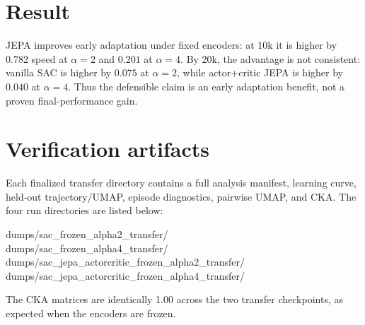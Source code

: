 \documentclass[10pt]{article}
\begin{document}
\section*{Result}
JEPA improves early adaptation under fixed encoders: at 10k it is higher by
$0.782$ speed at $\alpha=2$ and $0.201$ at $\alpha=4$.  By 20k, the advantage
is not consistent: vanilla SAC is higher by $0.075$ at $\alpha=2$, while
actor+critic JEPA is higher by $0.040$ at $\alpha=4$.  Thus the defensible
claim is an early adaptation benefit, not a proven final-performance gain.

\section*{Verification artifacts}
Each finalized transfer directory contains a full analysis manifest, learning
curve, held-out trajectory/UMAP, episode diagnostics, pairwise UMAP, and CKA.
The four run directories are listed below:
\begin{center}\small\ttfamily
dumps/sac\_frozen\_alpha2\_transfer/\\
dumps/sac\_frozen\_alpha4\_transfer/\\
dumps/sac\_jepa\_actorcritic\_frozen\_alpha2\_transfer/\\
dumps/sac\_jepa\_actorcritic\_frozen\_alpha4\_transfer/
\end{center}
The CKA matrices are identically 1.00 across the two transfer checkpoints, as
expected when the encoders are frozen.
\end{document}
